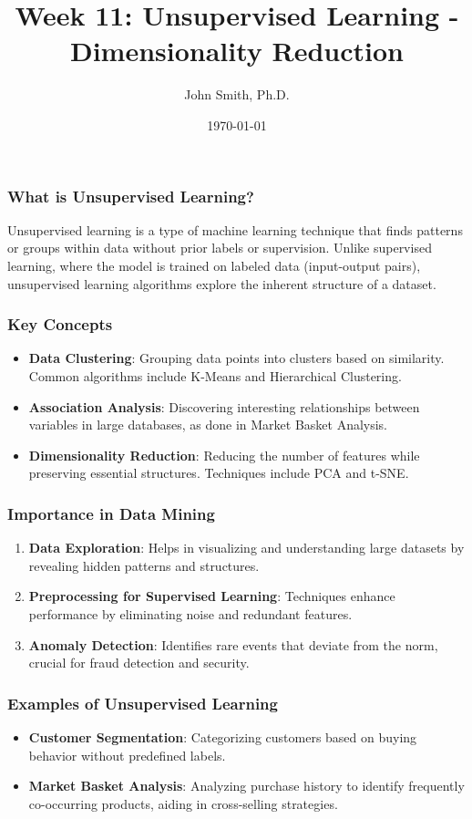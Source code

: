 \documentclass[aspectratio=169]{beamer}
\title[Unsupervised Learning]{Week 11: Unsupervised Learning - Dimensionality Reduction}
\author[J. Smith]{John Smith, Ph.D.}
\institute[University Name]{
  Department of Computer Science\\
  University Name\\
  \vspace{0.3cm}
  Email: email@university.edu\\
  Website: www.university.edu
}
\date{\today}
\begin{document}
\frame{\titlepage}

\begin{frame}[fragile]
  \titlepage
\end{frame}

\begin{frame}[fragile]
  \frametitle{What is Unsupervised Learning?}
  Unsupervised learning is a type of machine learning technique that finds patterns or groups within data without prior labels or supervision. Unlike supervised learning, where the model is trained on labeled data (input-output pairs), unsupervised learning algorithms explore the inherent structure of a dataset.
\end{frame}

\begin{frame}[fragile]
  \frametitle{Key Concepts}
  \begin{itemize}
    \item \textbf{Data Clustering}: Grouping data points into clusters based on similarity. Common algorithms include K-Means and Hierarchical Clustering.
    \item \textbf{Association Analysis}: Discovering interesting relationships between variables in large databases, as done in Market Basket Analysis.
    \item \textbf{Dimensionality Reduction}: Reducing the number of features while preserving essential structures. Techniques include PCA and t-SNE.
  \end{itemize}
\end{frame}

\begin{frame}[fragile]
  \frametitle{Importance in Data Mining}
  \begin{enumerate}
    \item \textbf{Data Exploration}: Helps in visualizing and understanding large datasets by revealing hidden patterns and structures.
    \item \textbf{Preprocessing for Supervised Learning}: Techniques enhance performance by eliminating noise and redundant features.
    \item \textbf{Anomaly Detection}: Identifies rare events that deviate from the norm, crucial for fraud detection and security.
  \end{enumerate}
\end{frame}

\begin{frame}[fragile]
  \frametitle{Examples of Unsupervised Learning}
  \begin{itemize}
    \item \textbf{Customer Segmentation}: Categorizing customers based on buying behavior without predefined labels.
    \item \textbf{Market Basket Analysis}: Analyzing purchase history to identify frequently co-occurring products, aiding in cross-selling strategies.
  \end{itemize}
\end{frame}
\end{document}
